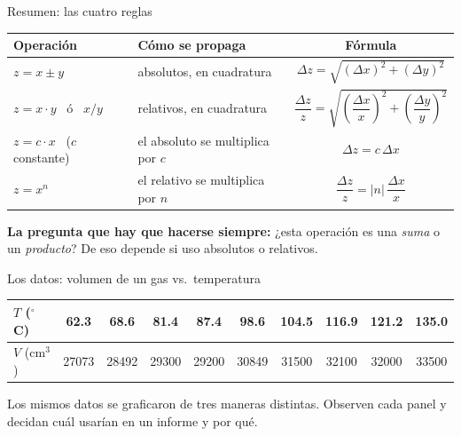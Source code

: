 \documentclass[aspectratio=169,xcolor=dvipsnames]{beamer}
\begin{document}
	\begin{frame}{Resumen: las cuatro reglas}
		\begin{center}
			\footnotesize
			\begin{tabular}{@{}llc@{}}
				\toprule
				\textbf{Operación} & \textbf{Cómo se propaga} & \textbf{Fórmula} \\
				\midrule
				$z = x \pm y$   & absolutos, en cuadratura
				& $\Delta z = \sqrt{(\Delta x)^2 + (\Delta y)^2}$ \\[5pt]
				
				$z = x\cdot y$ \ ó \ $x/y$ & relativos, en cuadratura
				& $\dfrac{\Delta z}{z} = \sqrt{\left(\dfrac{\Delta x}{x}\right)^2
					+ \left(\dfrac{\Delta y}{y}\right)^2}$ \\[9pt]
				
				$z = c\cdot x$ \ ($c$ constante) & el absoluto se multiplica por $c$
				& $\Delta z = c\,\Delta x$ \\[5pt]
				
				$z = x^{n}$ & el relativo se multiplica por $n$
				& $\dfrac{\Delta z}{z} = |n|\,\dfrac{\Delta x}{x}$ \\
				\bottomrule
			\end{tabular}
		\end{center}
		
		\vspace{0.4cm}
		\begin{center}
			\small \textcolor{UnalGreen}{\textbf{La pregunta que hay que hacerse siempre:}}
			¿esta operación es una \emph{suma} o un \emph{producto}?
			De eso depende si uso absolutos o relativos.
		\end{center}
	\end{frame}
	
	
	\begin{frame}{Los datos: volumen de un gas vs.\ temperatura}
		\begin{center}
			\footnotesize
			\begin{tabular}{lccccccccc}
				\toprule
				$T$ ($^\circ$C) & 62.3 & 68.6 & 81.4 & 87.4 & 98.6 & 104.5 & 116.9 & 121.2 & 135.0 \\
				\midrule
				$V$ (cm$^3$) & 27073 & 28492 & 29300 & 29200 & 30849 & 31500 & 32100 & 32000 & 33500 \\
				\bottomrule
			\end{tabular}
		\end{center}
		
		\vspace{0.4cm}
		\begin{center}
			\small
			Los mismos datos se graficaron de tres maneras distintas.
			Observen cada panel y decidan cuál usarían en un informe y por qué.
		\end{center}
	\end{frame}
	
\end{document}
